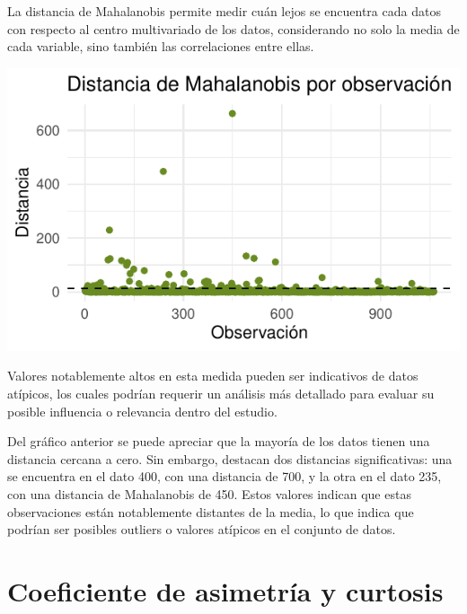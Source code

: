 \documentclass[]{tufte-handout}
\begin{document}
\begin{justify}

La distancia de Mahalanobis permite medir cuán lejos se encuentra cada datos con respecto al centro multivariado de los datos, considerando no solo la media de cada variable, sino también las correlaciones entre ellas. 
\begin{marginfigure}
\includegraphics[width=1.2\linewidth]{Informe_files/figure-latex/mahabis-1} \end{marginfigure}
Valores notablemente altos en esta medida pueden ser indicativos de datos atípicos, los cuales podrían requerir un análisis más detallado para evaluar su posible influencia o relevancia dentro del estudio.

Del gráfico anterior se puede apreciar que la mayoría de los datos tienen una distancia cercana a cero. Sin embargo, destacan dos distancias significativas: una se encuentra en el dato 400, con una distancia de 700, y la otra en el dato 235, con una distancia de Mahalanobis de 450. Estos valores indican que estas observaciones están notablemente distantes de la media, lo que indica que podrían ser posibles outliers o valores atípicos en el conjunto de datos.
\end{justify}

\section{Coeficiente de asimetría y
curtosis}\label{coeficiente-de-asimetruxeda-y-curtosis}
\end{document}
